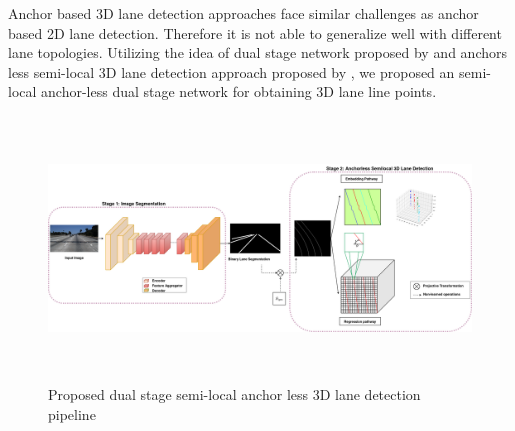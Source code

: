         
        Anchor based 3D lane detection approaches face similar challenges as anchor based 2D lane detection. Therefore it is not able to generalize well with different lane topologies. Utilizing the idea of dual stage network proposed by \cite{guo2020gen} and anchors less semi-local 3D lane detection approach proposed by \cite{DBLP:journals/corr/abs-2011-01535}, we proposed an semi-local anchor-less dual stage network for obtaining 3D lane line points.
        
        \begin{figure}[h]
    \centering
    \includegraphics[width=\textwidth, height=7cm]{images/3DlaneAUXNet.png}
    \caption{Proposed dual stage semi-local anchor less 3D lane detection pipeline  \cite{guo2020gen}}
    \end{figure}
        
